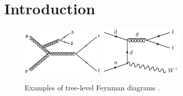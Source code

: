 \section{Introduction}
\label{sec:intro}

\begin{figure}[!htb]
\centering
\includegraphics[width=0.35\textwidth]{Plots/ttbb/ttbb}
\includegraphics[width=0.35\textwidth]{Plots/ttV/ttW}
  \caption{Examples of tree-level Feynman diagrams . \label{intro:sig}}
\end{figure}
